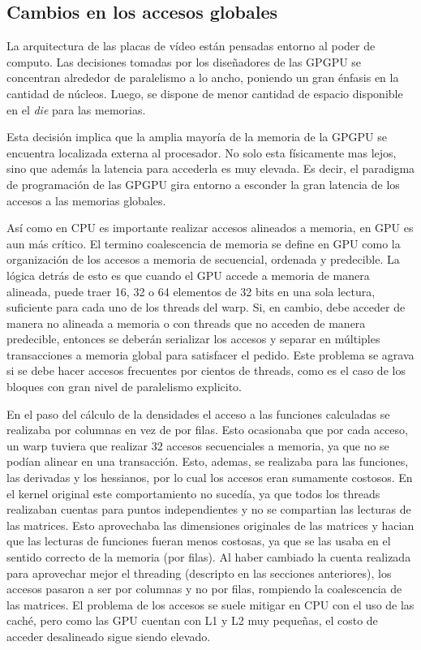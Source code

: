 

\subsection{Cambios en los accesos globales}
La arquitectura de las placas de v\'ideo est\'an pensadas entorno al poder de computo.
Las decisiones tomadas por los dise\~nadores de las GPGPU se concentran alrededor
de paralelismo a lo ancho, poniendo un gran \'enfasis en la cantidad de n\'ucleos. Luego,
se dispone de menor cantidad de espacio disponible en el \textit{die} para las memorias.

Esta decisi\'on implica que la amplia mayor\'ia de la memoria de la GPGPU se encuentra
localizada externa al procesador.  No solo esta f\'isicamente mas lejos, sino que
adem\'as la latencia para accederla es muy elevada. Es decir, el paradigma de
programaci\'on de las GPGPU gira entorno a esconder la gran latencia de los accesos
a las memorias globales.

As\'i como en CPU es importante realizar accesos alineados a memoria, en GPU es aun m\'as cr\'itico.
El termino coalescencia de memoria se define en GPU como la organizaci\'on de los accesos a memoria de secuencial, ordenada y predecible.
La l\'ogica detr\'as de esto es que cuando el GPU accede a memoria de manera alineada, puede traer 16, 32 o 64 elementos de 32 bits en una sola lectura, suficiente para
cada uno de los threads del warp. Si, en cambio, debe acceder de manera no
alineada a memoria o con threads que no acceden de manera predecible, entonces
se deber\'an serializar los accesos y separar en m\'ultiples transacciones a memoria global para satisfacer
el pedido. Este problema se agrava si se debe hacer accesos frecuentes
por cientos de threads, como es el caso de los bloques con gran nivel de paralelismo explicito.

En el paso del c\'alculo de la densidades el acceso a las funciones calculadas
se realizaba por columnas en vez de por filas. Esto ocasionaba que por cada acceso,
un warp tuviera que realizar 32 accesos secuenciales a memoria, ya que no se pod\'ian alinear
en una transacci\'on. Esto, ademas, se realizaba para las funciones, las derivadas y los
hessianos, por lo cual los accesos eran sumamente costosos. En el kernel original este comportamiento
no suced\'ia, ya que todos los threads realizaban cuentas para puntos independientes y no se compartian las
lecturas de las matrices. Esto aprovechaba las dimensiones originales de las matrices y hacian que las lecturas de
funciones fueran menos costosas, ya que se las usaba en el sentido correcto de la memoria (por filas).
Al haber cambiado la cuenta realizada para aprovechar mejor el threading (descripto en las secciones anteriores),
los accesos pasaron a ser por columnas y no por filas, rompiendo la coalescencia de las matrices. El
problema de los accesos se suele mitigar en CPU con el uso de las cach\'e, pero como las GPU cuentan
con L1 y L2 muy peque\~nas, el costo de acceder desalineado sigue siendo elevado.

